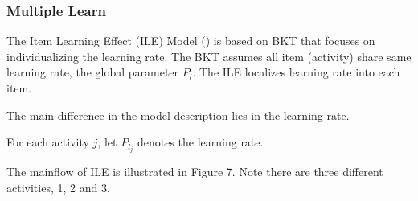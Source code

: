 \documentclass{article}
\begin{document}
\begin{center}
\end{center}

\subsubsection{Multiple Learn}

The Item Learning Effect (ILE) Model (\cite{multilearn}) is based on BKT that focuses on individualizing the learning rate. The BKT assumes all item (activity) share same learning rate, the global parameter \( P_l \). The ILE localizes learning rate into each item.

The main difference in the model description lies in the learning rate.

For each activity \( j \), let \( P_{l_j} \) denotes the learning rate.

The mainflow of ILE is illustrated in Figure 7. Note there are three different activities, 1, 2 and 3.
\end{document}
